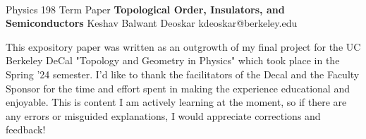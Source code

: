 \documentclass[11pt]{article}
\begin{document}
\thispagestyle{empty}
\bigskip \
\vspace{0.1cm}

\begin{center}
{\fontsize{22}{22} \selectfont Physics 198 Term Paper}
\vskip 16pt
{\fontsize{36}{36} \selectfont \bf \sffamily Topological Order, Insulators, and Semiconductors}
\vskip 24pt
{\fontsize{18}{18} \selectfont \rmfamily Keshav Balwant Deoskar} 
\vskip 6pt
{\fontsize{14}{14} \selectfont \ttfamily kdeoskar@berkeley.edu} 
\vskip 24pt
\end{center}

This expository paper was written as an outgrowth of my final project for the UC Berkeley DeCal "Topology and Geometry in Physics" which took place in the Spring '24 semester. I'd like to thank the facilitators of the Decal and the Faculty Sponsor for the time and effort spent in making the experience educational and enjoyable. This is content I am actively learning at the moment, so if there are any errors or misguided explanations, I would appreciate corrections and feedback!

\microtoc
\newpage

\end{document}
